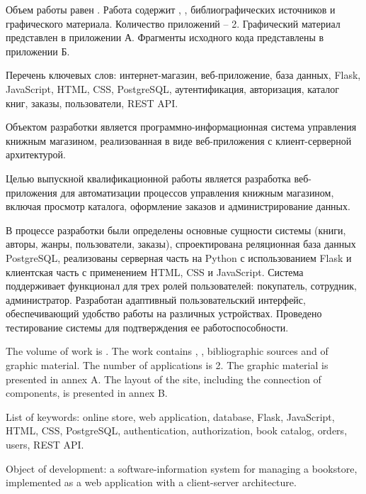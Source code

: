 
Объем работы равен . Работа содержит , ,  библиографических источников и  графического материала. Количество приложений – 2. Графический материал представлен в приложении А. Фрагменты исходного кода представлены в приложении Б.

Перечень ключевых слов: интернет-магазин, веб-приложение, база данных, Flask, JavaScript, HTML, CSS, PostgreSQL, аутентификация, авторизация, каталог книг, заказы, пользователи, REST API.

Объектом разработки является программно-информационная система управления книжным магазином, реализованная в виде веб-приложения с клиент-серверной архитектурой.

Целью выпускной квалификационной работы является разработка веб-приложения для автоматизации процессов управления книжным магазином, включая просмотр каталога, оформление заказов и администрирование данных.

В процессе разработки были определены основные сущности системы (книги, авторы, жанры, пользователи, заказы), спроектирована реляционная база данных PostgreSQL, реализованы серверная часть на Python с использованием Flask и клиентская часть с применением HTML, CSS и JavaScript. Система поддерживает функционал для трех ролей пользователей: покупатель, сотрудник, администратор. Разработан адаптивный пользовательский интерфейс, обеспечивающий удобство работы на различных устройствах. Проведено тестирование системы для подтверждения ее работоспособности.

  
The volume of work is . The work contains , ,  bibliographic sources and  of graphic material. The number of applications is 2. The graphic material is presented in annex A. The layout of the site, including the connection of components, is presented in annex B.

List of keywords: online store, web application, database, Flask, JavaScript, HTML, CSS, PostgreSQL, authentication, authorization, book catalog, orders, users, REST API.

Object of development: a software-information system for managing a bookstore, implemented as a web application with a client-server architecture.

